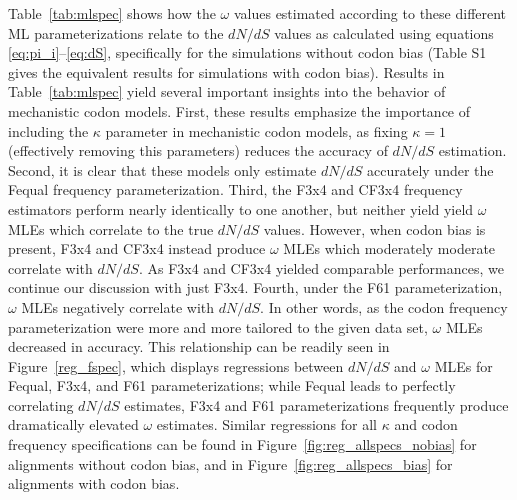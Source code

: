 \documentclass[11pt]{article}
\begin{document}
Table~\ref{tab:mlspec} shows how the $\omega$ values estimated according to these different ML parameterizations relate to the $dN/dS$ values as calculated using equations \eqref{eq:pi_i}--\eqref{eq:dS}, specifically for the simulations without codon bias (Table S1 gives the equivalent results for simulations with codon bias). Results in Table~\ref{tab:mlspec} yield several important insights into the behavior of mechanistic codon models. First, these results emphasize the importance of including the $\kappa$ parameter in mechanistic codon models, as fixing $\kappa = 1$ (effectively removing this parameters) reduces the accuracy of $dN/dS$ estimation. Second, it is clear that these models only estimate $dN/dS$ accurately under the Fequal frequency parameterization. Third, the F3x4 and CF3x4 frequency estimators perform nearly identically to one another, but neither yield yield $\omega$ MLEs which correlate to the true $dN/dS$ values. However, when codon bias is present, F3x4 and CF3x4 instead produce $\omega$ MLEs which moderately moderate correlate with $dN/dS$. As F3x4 and CF3x4 yielded comparable performances, we continue our discussion with just F3x4. Fourth, under the F61 parameterization, $\omega$ MLEs negatively correlate with $dN/dS$. In other words, as the codon frequency parameterization were more and more tailored to the given data set, $\omega$ MLEs decreased in accuracy. This relationship can be readily seen in Figure~\ref{reg_fspec}, which displays regressions between $dN/dS$ and $\omega$ MLEs for Fequal, F3x4, and F61 parameterizations; while Fequal leads to perfectly correlating $dN/dS$ estimates, F3x4 and F61 parameterizations frequently produce dramatically elevated $\omega$ estimates. Similar regressions for all $\kappa$ and codon frequency specifications can be found in Figure~\ref{fig:reg_allspecs_nobias} for alignments without codon bias, and in Figure~\ref{fig:reg_allspecs_bias} for alignments with codon bias.
\end{document}
